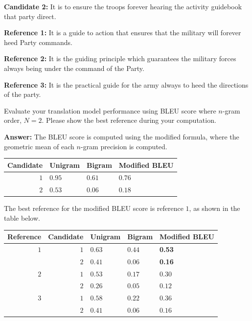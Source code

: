 \documentclass[12pt]{article}
\begin{document}
\noindent\textbf{Candidate 2:} It is to ensure the troops forever hearing the activity
guidebook that party direct.

\noindent\textbf{Reference 1:} It is a guide to action that ensures that the military
will forever heed Party commands.

\noindent\textbf{Reference 2:} It is the guiding principle which guarantees the military
forces always being under the command of the Party.

\noindent\textbf{Reference 3:} It is the practical guide for the army always to heed the
directions of the party.

Evaluate your translation model performance using BLEU score where $n$-gram
order, $N=2$. Please show the best reference during your computation.

\textbf{Answer:} The BLEU score is computed using the modified formula, where
the geometric mean of each $n$-gram precision is computed.
\begin{table}[!ht]
      \centering
      \begin{tabular}{|rll|l|}
            \hline
            Candidate & Unigram & Bigram & Modified BLEU \\
            \hline
            $1$       & $0.95$  & $0.61$ & $0.76$        \\
            $2$       & $0.53$  & $0.06$ & $0.18$        \\
            \hline
      \end{tabular}
\end{table}

The best reference for the modified BLEU score is reference $1$, as shown in the
table below.

\begin{table}[!ht]
      \centering
      \begin{tabular}{|r|rll|l|}
            \hline
            Reference & Candidate & Unigram & Bigram & Modified BLEU \\
            \hline
            $1$       & $1$       & $0.63$  & $0.44$ & \textbf{0.53} \\
                      & $2$       & $0.41$  & $0.06$ & \textbf{0.16} \\
            \hline
            $2$       & $1$       & $0.53$  & $0.17$ & $0.30$        \\
                      & $2$       & $0.26$  & $0.05$ & $0.12$        \\
            \hline
            $3$       & $1$       & $0.58$  & $0.22$ & $0.36$        \\
                      & $2$       & $0.41$  & $0.06$ & $0.16$        \\
            \hline
      \end{tabular}
\end{table}
\end{document}

